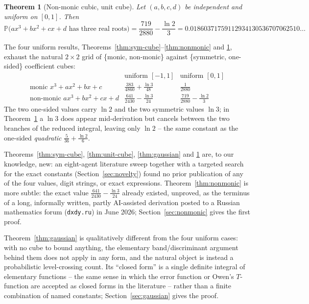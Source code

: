 \documentclass[11pt,reqno]{amsart}
\theoremstyle{plain}
\newtheorem{theorem}{Theorem}
\theoremstyle{remark}
\newcommand{\Prb}{\mathbb{P}}
\begin{document}
\begin{theorem}[Non-monic cubic, unit cube] \label{thm:nonmonic-unit}
Let $(a,b,c,d)$ be independent and uniform on $[0,1]$. Then
\[
  \Prb\bigl(ax^3+bx^2+cx+d \text{ has three real roots}\bigr)
  = \frac{719}{2880}-\frac{\ln 2}{3}
  = 0.01860371759112934130536707062510\ldots
\]
\end{theorem}

The four uniform results, Theorems~\ref{thm:sym-cube}--\ref{thm:nonmonic}
and \ref{thm:nonmonic-unit}, exhaust the natural $2\times2$ grid of
\{monic, non-monic\} against \{symmetric, one-sided\} coefficient cubes:
\[
\renewcommand{\arraystretch}{1.4}
\begin{array}{r|cc}
 & \text{uniform }[-1,1] & \text{uniform }[0,1] \\ \hline
\text{monic } x^3+ax^2+bx+c & \tfrac{383}{4860}+\tfrac{\ln3}{48} & \tfrac{1}{2880} \\
\text{non-monic } ax^3+bx^2+cx+d & \tfrac{641}{2430}-\tfrac{\ln3}{24} & \tfrac{719}{2880}-\tfrac{\ln2}{3}
\end{array}
\]
The two one-sided values carry $\ln 2$ and the two symmetric values $\ln 3$;
in Theorem~\ref{thm:nonmonic-unit} a $\ln 3$ does appear mid-derivation but
cancels between the two branches of the reduced integral, leaving only
$\ln 2$ -- the same constant as the one-sided \emph{quadratic}
$\tfrac{5}{36}+\tfrac{\ln 2}{6}$.

Theorems~\ref{thm:sym-cube}, \ref{thm:unit-cube}, \ref{thm:gaussian}
and \ref{thm:nonmonic-unit} are, to our knowledge, new: an eight-agent
literature sweep together with a targeted search for the exact constants
(Section~\ref{sec:novelty}) found no prior publication of any of the four
values, digit strings, or exact expressions. Theorem~\ref{thm:nonmonic} is
more subtle: the exact value $\tfrac{641}{2430}-\tfrac{\ln3}{24}$ already
existed, unproved, as the terminus of a long, informally written, partly
AI-assisted derivation posted to a Russian mathematics forum
(\texttt{dxdy.ru}) in June 2026; Section~\ref{sec:nonmonic} gives the first
proof.

Theorem~\ref{thm:gaussian} is qualitatively different from the four uniform
cases: with no cube to bound anything, the elementary band/discriminant
argument behind them does not apply in any form, and the natural object is
instead a probabilistic level-crossing count. Its ``closed form'' is a single
definite integral of elementary functions -- the same sense in which the
error function or Owen's $T$-function are accepted as closed forms in the
literature -- rather than a finite combination of named constants;
Section~\ref{sec:gaussian} gives the proof.
\end{document}

